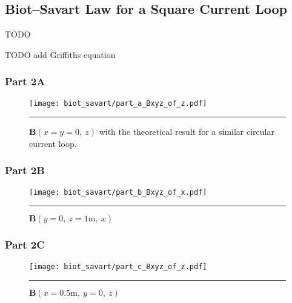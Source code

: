\documentclass[notitlepage,aps,prd,nofootinbib]{revtex4-1}
\begin{document}
\subsection{Biot--Savart Law for a Square Current Loop}
\label{subsec:biot_savart_results}
TODO

TODO add Griffiths equation


\clearpage
\subsubsection{Part 2A}
\label{subsubsec:part_2a}

\begin{figure}[!htbc]
  \centering
  \texttt{[image: biot\_savart/part\_a\_Bxyz\_of\_z.pdf]}
	{\par\nobreak\rule[9pt]{35em}{0.5pt}\vspace{-5mm}}
	\caption{$\mathbf{B}\left(x=y=0,~z\right)$ with the theoretical result for a similar circular current loop.}
	\label{fig:part2a}
\end{figure}


\clearpage
\subsubsection{Part 2B}
\label{subsubsec:part_2b}

\begin{figure}[!htbc]
  \centering
  \texttt{[image: biot\_savart/part\_b\_Bxyz\_of\_x.pdf]}
	{\par\nobreak\rule[9pt]{35em}{0.5pt}\vspace{-5mm}}
	\caption{$\mathbf{B}\left(y=0,~z=1\mathrm{m},~x\right)$}
	\label{fig:part2b}
\end{figure}

\subsubsection{Part 2C}
\label{subsubsec:part_2c}

\begin{figure}[!htbc]
  \centering
  \texttt{[image: biot\_savart/part\_c\_Bxyz\_of\_z.pdf]}
	{\par\nobreak\rule[9pt]{35em}{0.5pt}\vspace{-5mm}}
	\caption{$\mathbf{B}\left(x=0.5\mathrm{m},~y=0,~z\right)$}
	\label{fig:part2c}
\end{figure}

\begin{comment}
\clearpage
\section{Conclusions}
\label{sec:Conclusions}
No time...

The Python source code used to produce these results can be found online at \url{http://github.com/mepland/PHYS_566_Computational_HW/tree/master/midterm/code}, and is included in Section~\ref{sec:code}.
\end{comment}
\end{document}
